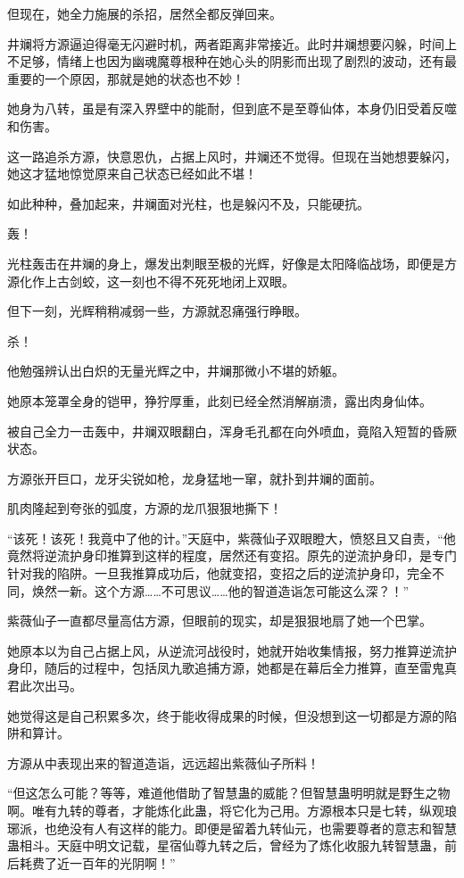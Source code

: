\begin{this_body}
但现在，她全力施展的杀招，居然全都反弹回来。

井斓将方源逼迫得毫无闪避时机，两者距离非常接近。此时井斓想要闪躲，时间上不足够，情绪上也因为幽魂魔尊根种在她心头的阴影而出现了剧烈的波动，还有最重要的一个原因，那就是她的状态也不妙！

她身为八转，虽是有深入界壁中的能耐，但到底不是至尊仙体，本身仍旧受着反噬和伤害。

这一路追杀方源，快意恩仇，占据上风时，井斓还不觉得。但现在当她想要躲闪，她这才猛地惊觉原来自己状态已经如此不堪！

如此种种，叠加起来，井斓面对光柱，也是躲闪不及，只能硬抗。

轰！

光柱轰击在井斓的身上，爆发出刺眼至极的光辉，好像是太阳降临战场，即便是方源化作上古剑蛟，这一刻也不得不死死地闭上双眼。

但下一刻，光辉稍稍减弱一些，方源就忍痛强行睁眼。

杀！

他勉强辨认出白炽的无量光辉之中，井斓那微小不堪的娇躯。

她原本笼罩全身的铠甲，狰狞厚重，此刻已经全然消解崩溃，露出肉身仙体。

被自己全力一击轰中，井斓双眼翻白，浑身毛孔都在向外喷血，竟陷入短暂的昏厥状态。

方源张开巨口，龙牙尖锐如枪，龙身猛地一窜，就扑到井斓的面前。

肌肉隆起到夸张的弧度，方源的龙爪狠狠地撕下！

“该死！该死！我竟中了他的计。”天庭中，紫薇仙子双眼瞪大，愤怒且又自责，“他竟然将逆流护身印推算到这样的程度，居然还有变招。原先的逆流护身印，是专门针对我的陷阱。一旦我推算成功后，他就变招，变招之后的逆流护身印，完全不同，焕然一新。这个方源……不可思议……他的智道造诣怎可能这么深？！”

紫薇仙子一直都尽量高估方源，但眼前的现实，却是狠狠地扇了她一个巴掌。

她原本以为自己占据上风，从逆流河战役时，她就开始收集情报，努力推算逆流护身印，随后的过程中，包括凤九歌追捕方源，她都是在幕后全力推算，直至雷鬼真君此次出马。

她觉得这是自己积累多次，终于能收得成果的时候，但没想到这一切都是方源的陷阱和算计。

方源从中表现出来的智道造诣，远远超出紫薇仙子所料！

“但这怎么可能？等等，难道他借助了智慧蛊的威能？但智慧蛊明明就是野生之物啊。唯有九转的尊者，才能炼化此蛊，将它化为己用。方源根本只是七转，纵观琅琊派，也绝没有人有这样的能力。即便是留着九转仙元，也需要尊者的意志和智慧蛊相斗。天庭中明文记载，星宿仙尊九转之后，曾经为了炼化收服九转智慧蛊，前后耗费了近一百年的光阴啊！”


\end{this_body}
